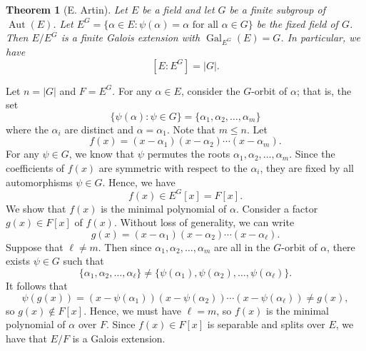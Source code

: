 \documentclass[10pt]{article}
\makeatletter
\DeclareMathOperator{\Aut}{Aut}
\DeclareMathOperator{\Gal}{Gal}
\theoremstyle{newstyle}
\newtheorem{thm}{Theorem}[section]
\newenvironment{pf}[1][\proofname]{\par
  \pushQED{\qed}%
  \normalfont \topsep0\p@\relax
  \trivlist
  \item[\hskip\labelsep\scshape
  #1\@addpunct{.}]\ignorespaces
}{%
  \popQED\endtrivlist\@endpefalse
}
\makeatother
\begin{document}
\begin{thm}[E. Artin]
Let $E$ be a field and let $G$ be a finite subgroup of $\Aut(E)$. Let $E^G = 
\{\alpha \in E : \psi(\alpha) = \alpha \text{ for all } \alpha \in G\}$ be the fixed 
field of $G$. Then $E/E^G$ is a finite Galois extension with $\Gal_{E^G}(E) = G$. 
In particular, we have 
\[ [E : E^G] = |G|. \]
\end{thm}
\begin{pf}
Let $n = |G|$ and $F = E^G$. For any $\alpha \in E$, consider the $G$-orbit of $\alpha$; that is, 
the set 
\[ \{\psi(\alpha) : \psi \in G\} = \{\alpha_1, \alpha_2, \dots, \alpha_m\} \]
where the $\alpha_i$ are distinct and $\alpha = \alpha_1$. Note that $m \leq n$. Let 
\[ f(x) = (x-\alpha_1)(x-\alpha_2) \cdots (x-\alpha_m). \]
For any $\psi \in G$, we know that $\psi$ permutes the roots $\alpha_1, \alpha_2, \dots, \alpha_m$.
Since the coefficients of $f(x)$ are symmetric with respect to the $\alpha_i$, they are fixed by all 
automorphisms $\psi \in G$. Hence, we have 
\[ f(x) \in E^G[x] = F[x]. \]
We show that $f(x)$ is the minimal polynomial of $\alpha$. Consider a factor $g(x) \in F[x]$ of 
$f(x)$. Without loss of generality, we can write 
\[ g(x) = (x-\alpha_1) (x-\alpha_2) \cdots (x - \alpha_\ell). \]
Suppose that $\ell \neq m$. Then since $\alpha_1, \alpha_2, \dots, \alpha_m$ are all in the 
$G$-orbit of $\alpha$, there exists $\psi \in G$ such that 
\[ \{\alpha_1, \alpha_2, \dots, \alpha_\ell\} \neq \{\psi(\alpha_1), \psi(\alpha_2),
\dots, \psi(\alpha_\ell)\}. \]
It follows that 
\[ \psi(g(x)) = (x - \psi(\alpha_1))(x - \psi(\alpha_2)) \cdots (x - \psi(\alpha_\ell)) \neq g(x), \]
so $g(x) \notin F[x]$. Hence, we must have $\ell = m$, so $f(x)$ is the minimal polynomial 
of $\alpha$ over $F$. Since $f(x) \in F[x]$ is separable and splits over $E$, we have that 
$E/F$ is a Galois extension. 


\end{pf}
\end{document}
